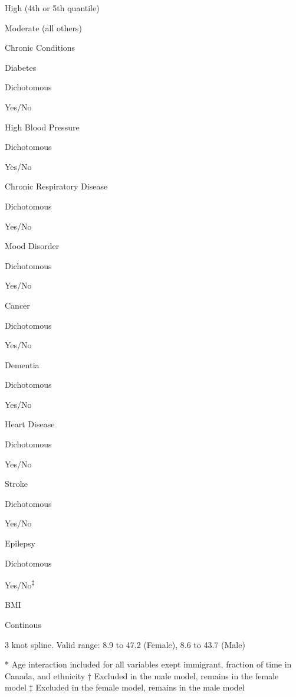 \documentclass[]{book}
\begin{document}
High (4th or 5th quantile)

Moderate (all others)

Chronic Conditions

Diabetes

Dichotomous

Yes/No

High Blood Pressure

Dichotomous

Yes/No

Chronic Respiratory Disease

Dichotomous

Yes/No

Mood Disorder

Dichotomous

Yes/No

Cancer

Dichotomous

Yes/No

Dementia

Dichotomous

Yes/No

Heart Disease

Dichotomous

Yes/No

Stroke

Dichotomous

Yes/No

Epilepsy

Dichotomous

Yes/No\textsuperscript{‡}

BMI

Continous

3 knot spline. Valid range: 8.9 to 47.2 (Female), 8.6 to 43.7 (Male)

* Age interaction included for all variables exept immigrant, fraction
of time in Canada, and ethnicity † Excluded in the male model, remains
in the female model ‡ Excluded in the female model, remains in the male
model


\end{document}
